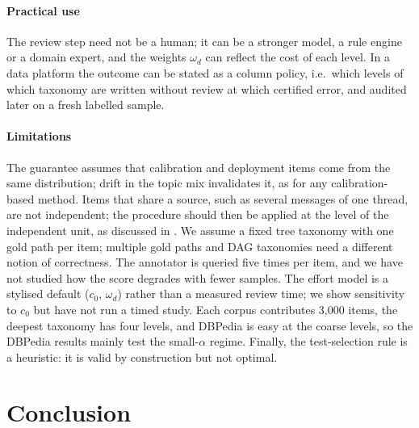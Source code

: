 \documentclass[preprint,12pt]{elsarticle}
\theoremstyle{definition}
\theoremstyle{remark}
\begin{document}
\paragraph{Practical use}
The review step need not be a human; it can be a stronger model, a rule engine
or a domain expert, and the weights $\omega_d$ can reflect the cost of each level. In
a data platform the outcome can be stated as a column policy, i.e.\ which levels
of which taxonomy are written without review at which certified error, and
audited later on a fresh labelled sample.

\paragraph{Limitations}
The guarantee assumes that calibration and deployment items come from the same
distribution; drift in the topic mix invalidates it, as for any calibration-based
method. Items that share a source, such as several messages of one thread, are
not independent; the procedure should then be applied at the level of the
independent unit, as discussed in \cite{perfield2026}. We assume a fixed tree
taxonomy with one gold path per item; multiple gold paths and DAG taxonomies need
a different notion of correctness. The annotator is queried five times per item,
and we have not studied how the score degrades with fewer samples. The effort
model is a stylised default ($c_0$, $\omega_d$) rather than a measured review
time; we show sensitivity to $c_0$ but have not run a timed study. Each corpus
contributes 3,000 items, the deepest taxonomy has four levels, and DBPedia is
easy at the coarse levels, so the DBPedia results mainly test the small-$\alpha$
regime. Finally, the
test-selection rule is a heuristic: it is valid by construction but not optimal.

\section{Conclusion}
\label{sec:conclusion}
\end{document}
